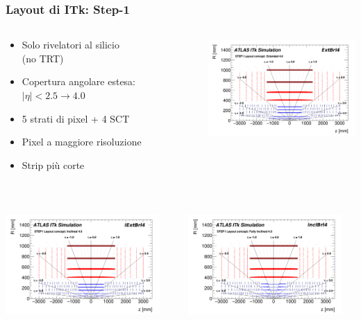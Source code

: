 \documentclass{beamer}
\begin{document}

\begin{frame}
\frametitle{Layout di ITk: Step-1}


\begin{columns}
\begin{column}{0.5\textwidth}
	\begin{itemize}
	\small
	\item Solo rivelatori al silicio \\ (no TRT)
	\item Copertura angolare estesa: $|\eta| < 2.5 \rightarrow 4.0$
	\item 5 strati di pixel + 4 SCT
	\item Pixel a maggiore risoluzione
	\item Strip pi\`u corte
	\end{itemize}
	\ \ \ \
\end{column}
\begin{column}{0.5\textwidth}
\includegraphics[width=\textwidth,height=3.8cm]{ExtBrl4}
\end{column}
\end{columns}

\begin{columns}
\begin{column}{0.5\textwidth}
\includegraphics[width=\textwidth,height=3.8cm]{IExtBrl4}
\end{column}
\begin{column}{0.5\textwidth}
\includegraphics[width=\textwidth,height=3.8cm]{InclBrl4}
\end{column}
\end{columns}

\end{frame}
\end{document}
